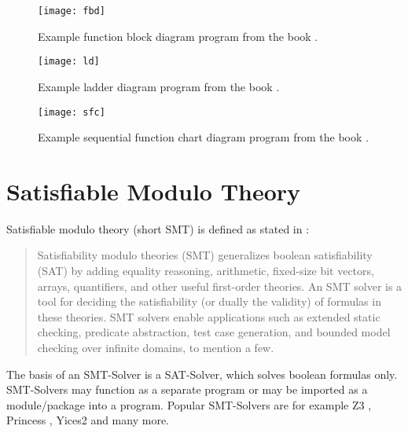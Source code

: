 \begin{figure}[h!]
	\centering
	\texttt{[image: fbd]}
	\caption{Example function block diagram program from the book \cite{johnIEC611313Programming2010}.}
	\label{code:fbd}
\end{figure}

\begin{figure}[h!]
	\centering
	\texttt{[image: ld]}
	\caption{Example ladder diagram program from the book \cite{johnIEC611313Programming2010}.}
	\label{code:ld}
\end{figure}

\begin{figure}[h!]
	\centering
	\texttt{[image: sfc]}
	\caption{Example sequential function chart diagram program from the book \cite{johnIEC611313Programming2010}.}
	\label{code:sfc}
\end{figure}

\clearpage
\pagebreak

\section{Satisfiable Modulo Theory}

Satisfiable modulo theory (short SMT) is defined as stated in \cite{demouraZ3EfficientSMT2008}:

\begin{quote}
	Satisfiability modulo theories (SMT) generalizes boolean satisfiability (SAT) by
	adding equality reasoning, arithmetic, fixed-size bit vectors, arrays, quantifiers,
	and other useful first-order theories. An SMT solver is a tool for deciding the satisfiability (or dually the validity) of formulas in these theories. SMT solvers enable
	applications such as extended static checking, predicate abstraction, test case generation, and bounded model checking over infinite domains, to mention a few. 
\end{quote}

The basis of an SMT-Solver is a SAT-Solver, which solves boolean formulas only. SMT-Solvers may function as a separate program or may be imported as a module/package into a program. 
Popular SMT-Solvers are for example Z3 \cite{demouraZ3EfficientSMT2008}, Princess \cite{princess08}, Yices2 \cite{Dutertre:cav2014} and many more.

